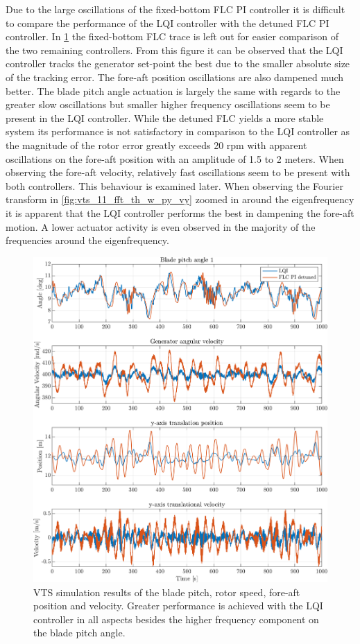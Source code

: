 Due to the large oscillations of the fixed-bottom FLC PI controller it is difficult to compare the performance of the LQI controller with the detuned FLC PI controller. In \cref{fig:vts_10_th_w_py_vy} the fixed-bottom FLC trace is left out for easier comparison of the two remaining controllers. From this figure it can be observed that the LQI controller tracks the generator set-point the best due to the smaller absolute size of the tracking error. The fore-aft position oscillations are also dampened much better. The blade pitch angle actuation is largely the same with regards to the greater slow oscillations but smaller higher frequency oscillations seem to be present in the LQI controller. While the detuned FLC yields a more stable system its performance is not satisfactory in comparison to the LQI controller as the magnitude of the rotor error greatly exceeds 20 rpm with apparent oscillations on the fore-aft position with an amplitude of 1.5 to 2 meters. When observing the fore-aft velocity, relatively fast oscillations seem to be present with both controllers. This behaviour is examined later. When observing the Fourier transform in \cref{fig:vts_11_fft_th_w_py_vy} zoomed in around the eigenfrequency it is apparent that the LQI controller performs the best in dampening the fore-aft motion. A lower actuator activity is even observed in the majority of the frequencies around the eigenfrequency.
\begin{figure}[h]
	\centering
	\includegraphics[width=0.63\linewidth]{Graphics/TestResults/VTSplotting/10_th_w_py_vy.png}
	\caption{VTS simulation results of the blade pitch, rotor speed, fore-aft position and velocity. Greater performance is achieved with the LQI controller in all aspects besides the higher frequency component on the blade pitch angle.}
	\label{fig:vts_10_th_w_py_vy}
\end{figure}
